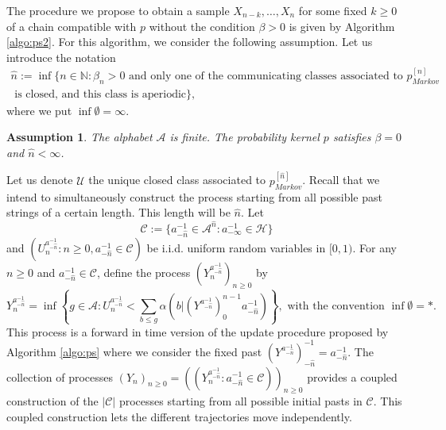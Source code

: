 \documentclass[a4paper]{article}
\newtheorem{assumption}{Assumption}
\newcommand{\N}{\mathbb{N}}
\renewcommand{\H}{\mathcal{H}}
\newcommand{\A}{\mathcal{A}}
\begin{document}
The procedure  we propose to obtain a sample $X_{n-k},\ldots, X_n$ for some fixed $ k\geq0$ of a chain compatible with $p$ without the condition $\beta>0$ is given by Algorithm \ref{algo:ps2}. For this algorithm, we consider the following assumption. Let us introduce the notation
\begin{multline*}
 \hat n :=
\inf\{ n\in \N: \beta_n >0  \text{ and only one of the communicating classes associated to  } p^{[n]}_{Markov} \\
\text{ is closed, and this class is aperiodic}\},
\end{multline*}
where we put $\inf\emptyset=\infty$.


\begin{assumption} \label{as:algo2}
The alphabet $\A$ is finite. The probability kernel $p$ satisfies $\beta=0$ and  $\hat n<\infty$.

\end{assumption}

Let us denote $\mathcal{U}$ the unique closed class associated to $p^{[\hat{n}]}_{Markov}$. Recall that we intend to simultaneously construct the process
starting from all possible past strings of a certain length. This length will be $\hat{n}$. 
Let 
$$
\mathcal{C}:=\{a_{- \hat n}^{-1} \in \A^{\hat n}:  a_{-\infty }^{-1}\in \H \}
$$
and  $(U_n^{a_{- \hat n}^{-1}}:n\geq0,a_{- \hat n}^{-1}\in \mathcal{C})$ be i.i.d. uniform random variables in $[0,1)$. For any $n\geq 0$ and $a_{- \hat n}^{-1}\in \mathcal{C}$, define the process $(Y_n^{a_{-\hat n}^{-1}})_{n\geq 0}$ by
\begin{equation} \label{def:Ynprocess}
Y_n^{a_{-\hat{n}}^{-1}}=\inf\left\{g\in \A: U_n^{a_{- \hat n}^{-1}} <  \sum_{b\leq g}\alpha(b|(Y^{a_{-\hat{n}}^{-1}})_0^{n-1}a_{-\hat{n}}^{-1})\right\}, \mbox{ with the convention }\inf\emptyset=* .
\end{equation}
This process is a forward in time version of the update procedure proposed by Algorithm \ref{algo:ps} where we consider the fixed past $(Y^{a_{-\hat{n}}^{-1}})^{-1}_{-\hat{n}}=a_{-\hat{n}}^{-1}$. The collection of processes $(Y_n)_{n\geq 0}=((Y_n^{a_{-\hat n}^{-1}}:a_{-\hat n}^{-1}\in \mathcal{C}))_{n\geq 0}$ provides a coupled construction of the $|\mathcal{C}|$ processes starting from all possible initial pasts in $\mathcal{C}$. This coupled construction lets the different trajectories move independently.


\end{document}
